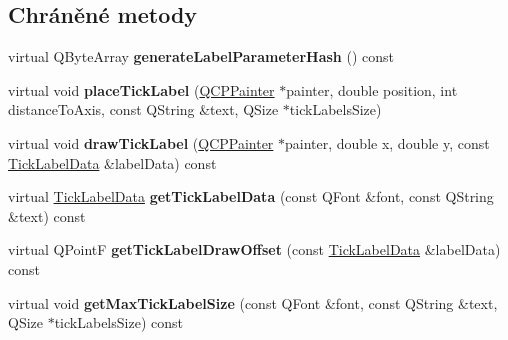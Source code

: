 \subsection*{Chráněné metody}
\begin{DoxyCompactItemize}
\item 
\hypertarget{classQCPAxisPainterPrivate_a91a023bbefe1c3bf330570c0b985de84}{}virtual Q\+Byte\+Array {\bfseries generate\+Label\+Parameter\+Hash} () const \label{classQCPAxisPainterPrivate_a91a023bbefe1c3bf330570c0b985de84}

\item 
\hypertarget{classQCPAxisPainterPrivate_af8fe7350c19575bc33ca770f9b3a15fd}{}virtual void {\bfseries place\+Tick\+Label} (\hyperlink{classQCPPainter}{Q\+C\+P\+Painter} $\ast$painter, double position, int distance\+To\+Axis, const Q\+String \&text, Q\+Size $\ast$tick\+Labels\+Size)\label{classQCPAxisPainterPrivate_af8fe7350c19575bc33ca770f9b3a15fd}

\item 
\hypertarget{classQCPAxisPainterPrivate_ad8f2f12cd35b8189e8bf96679e873933}{}virtual void {\bfseries draw\+Tick\+Label} (\hyperlink{classQCPPainter}{Q\+C\+P\+Painter} $\ast$painter, double x, double y, const \hyperlink{structQCPAxisPainterPrivate_1_1TickLabelData}{Tick\+Label\+Data} \&label\+Data) const \label{classQCPAxisPainterPrivate_ad8f2f12cd35b8189e8bf96679e873933}

\item 
\hypertarget{classQCPAxisPainterPrivate_ad9f24fbcbf9d8c92b34d9d00b010e6a3}{}virtual \hyperlink{structQCPAxisPainterPrivate_1_1TickLabelData}{Tick\+Label\+Data} {\bfseries get\+Tick\+Label\+Data} (const Q\+Font \&font, const Q\+String \&text) const \label{classQCPAxisPainterPrivate_ad9f24fbcbf9d8c92b34d9d00b010e6a3}

\item 
\hypertarget{classQCPAxisPainterPrivate_a6b02e6fd70cc65f726ca8cb3e6f16de4}{}virtual Q\+Point\+F {\bfseries get\+Tick\+Label\+Draw\+Offset} (const \hyperlink{structQCPAxisPainterPrivate_1_1TickLabelData}{Tick\+Label\+Data} \&label\+Data) const \label{classQCPAxisPainterPrivate_a6b02e6fd70cc65f726ca8cb3e6f16de4}

\item 
\hypertarget{classQCPAxisPainterPrivate_a8a7c82303e272485621fde78a5b674f9}{}virtual void {\bfseries get\+Max\+Tick\+Label\+Size} (const Q\+Font \&font, const Q\+String \&text, Q\+Size $\ast$tick\+Labels\+Size) const \label{classQCPAxisPainterPrivate_a8a7c82303e272485621fde78a5b674f9}

\end{DoxyCompactItemize}
